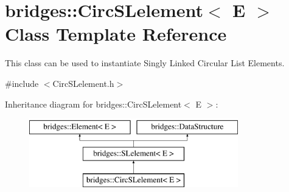 \hypertarget{classbridges_1_1_circ_s_lelement}{}\section{bridges\+:\+:Circ\+S\+Lelement$<$ E $>$ Class Template Reference}
\label{classbridges_1_1_circ_s_lelement}


This class can be used to instantiate Singly Linked Circular List Elements.  




{\ttfamily \#include $<$Circ\+S\+Lelement.\+h$>$}

Inheritance diagram for bridges\+:\+:Circ\+S\+Lelement$<$ E $>$\+:\begin{figure}[H]
\begin{center}
\leavevmode
\includegraphics[height=3.000000cm]{classbridges_1_1_circ_s_lelement}
\end{center}
\end{figure}
